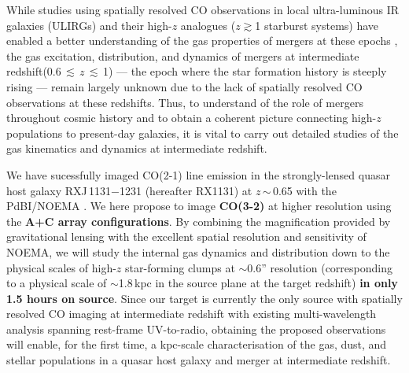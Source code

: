 \documentclass[11pt,a4paper,twoside,graphicx,color]{article}
\newcommand{\bco}{\mbox{CO(2-1)}\xspace}
\newcommand{\cco}{\mbox{CO(3-2)}\xspace}
\newcommand{\Fig}[1]{Fig.~\ref{fig:#1}}
\newcommand{\ssim}{\,$\sim$\,}
\newcommand{\mulw}{multi-wavelength\xspace}
\newcommand{\SF}{star formation\xspace}
\newcommand{\SB}{starburst\xspace}
\newcommand{\highz}{high-$z$\xspace}
\newcommand{\atinterz}{at intermediate redshift\xspace}
\newcommand{\obs}{observations\xspace}
\begin{document}
While studies using spatially resolved CO \obs in
local ultra-luminous IR galaxies (ULIRGs) and their \highz analogues ($z$$\gtrsim$1 \SB systems)
have enabled a better understanding of the gas properties of mergers at these epochs
\citep[e.g.][]{Carilli10a, Engel10a,Bothwell10a,Riechers11b, Ivison11a},
the gas excitation, distribution, and dynamics of mergers
\atinterz (0.6\,$\lesssim$\,$z$\,$\lesssim$\,1) --- the epoch where the \SF history is steeply rising --- remain largely unknown
due to the lack of spatially resolved CO observations at these redshifts.
Thus, to understand of the role of mergers throughout cosmic history and
to obtain a coherent picture connecting \highz populations to present-day galaxies,
it is vital to carry out detailed studies of the gas kinematics and dynamics \atinterz.

We have sucessfully imaged \bco line emission
in the strongly-lensed quasar host galaxy
 RXJ\,1131$-$1231 (hereafter RX1131) at $z$\ssim0.65
with the PdBI/NOEMA \citep[\Fig{combine};][]{Leung16b}.
We here propose to image {\bf \cco}
at higher resolution using the {\bf A+C array configurations}.
By combining the magnification provided by gravitational lensing with the excellent spatial resolution and sensitivity of NOEMA,
we will study the internal gas dynamics and distribution
down to the physical scales of \highz star-forming clumps 
at $\sim$0.6'' resolution 
(corresponding to a physical scale of $\sim$1.8\,kpc in the source plane at the target redshift)
{\bf in only 1.5 hours on source}.
Since our target is currently the only source with spatially resolved CO
imaging at intermediate redshift with existing \mulw analysis spanning rest-frame
UV-to-radio, obtaining the proposed \obs will enable, for the first time, a kpc-scale characterisation of the gas, dust, and stellar populations in a quasar host galaxy and merger at intermediate redshift.
\end{document}
